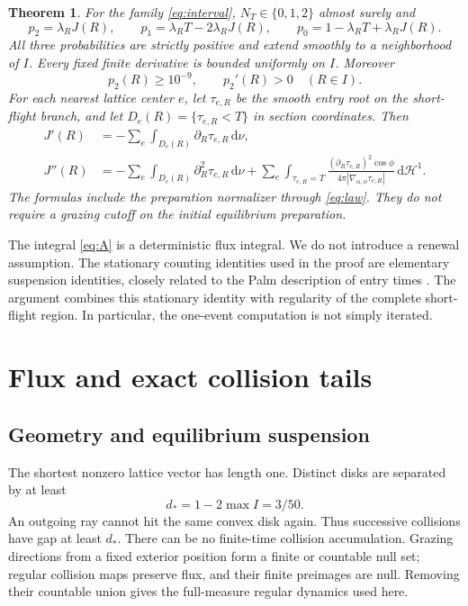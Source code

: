 \documentclass[11pt,reqno]{amsart}
\numberwithin{equation}{section}
\newtheorem{theorem}{Theorem}[section]
\theoremstyle{remark}\newtheorem{remark}[theorem]{Remark}
\newcommand{\dd}{\,\mathrm d}\newcommand{\one}{\mathbf1}\newcommand{\T}{\mathbb T}
\begin{document}
\begin{theorem}\label{thm:main}
For the family \eqref{eq:interval}, $N_T\in\{0,1,2\}$ almost surely and
\begin{equation}\label{eq:law}
 p_2=\lambda_R J(R),\qquad
 p_1=\lambda_R T-2\lambda_R J(R),\qquad
 p_0=1-\lambda_R T+\lambda_R J(R).
\end{equation}
All three probabilities are strictly positive and extend smoothly to a neighborhood of $I$. Every fixed finite derivative is bounded uniformly on $I$. Moreover
\[
 p_2(R)\ge 10^{-9},\qquad p_2'(R)>0\quad(R\in I).
\]
For each nearest lattice center $e$, let $\tau_{e,R}$ be the smooth entry root on the short-flight branch, and let $D_e(R)=\{\tau_{e,R}<T\}$ in section coordinates. Then
\begin{align}\label{eq:firstsecond}
 J'(R)&=-\sum_e\int_{D_e(R)}\partial_R\tau_{e,R}\dd\nu,\\
 J''(R)&=-\sum_e\int_{D_e(R)}\partial_R^2\tau_{e,R}\dd\nu
 +\sum_e\int_{\tau_{e,R}=T}
 \frac{(\partial_R\tau_{e,R})^2\cos\phi}{4\pi|\nabla_{\alpha,\phi}\tau_{e,R}|}\dd\mathcal H^1.
\end{align}
The formulas include the preparation normalizer through \eqref{eq:law}. They do not require a grazing cutoff on the initial equilibrium preparation.
\end{theorem}

The integral \eqref{eq:A} is a deterministic flux integral. We do not introduce a renewal assumption. The stationary counting identities used in the proof are elementary suspension identities, closely related to the Palm description of entry times \cite{Marklof}. The argument combines this stationary identity with regularity of the complete short-flight region. In particular, the one-event computation is not simply iterated.

\section{Flux and exact collision tails}
\subsection{Geometry and equilibrium suspension}
The shortest nonzero lattice vector has length one. Distinct disks are separated by at least
\begin{equation}\label{eq:gap}
 d_*=1-2\max I=3/50.
\end{equation}
An outgoing ray cannot hit the same convex disk again. Thus successive collisions have gap at least $d_*$. There can be no finite-time collision accumulation. Grazing directions from a fixed exterior position form a finite or countable null set; regular collision maps preserve flux, and their finite preimages are null. Removing their countable union gives the full-measure regular dynamics used here.
\end{document}
